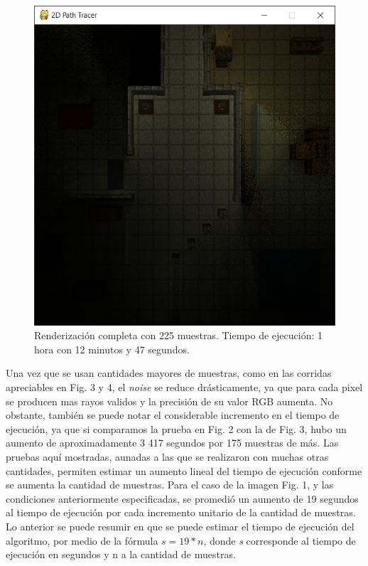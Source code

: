 \documentclass[conference]{IEEEtran}
\begin{document}
\begin{figure}[htbp]
\centerline{\includegraphics[scale=0.68]{Imagenes/Complete Lighting (225 Samples).png}}
\caption{Renderización completa con 225 muestras. Tiempo de ejecución: 1 hora con 12 minutos y 47 segundos.}
\label{225 muestras completo}
\end{figure}

Una vez que se usan cantidades mayores de muestras, como en las corridas apreciables en Fig. 3 y 4, el \textit{noise} se reduce drásticamente, ya que para cada pixel se producen mas rayos validos y la precisión de su valor RGB aumenta. No obstante, también se puede notar el considerable incremento en el tiempo de ejecución, ya que si comparamos la prueba en Fig. 2 con la de Fig. 3, hubo un aumento de aproximadamente 3 417 segundos por 175 muestras de más. Las pruebas aquí mostradas, aunadas a las que se realizaron con muchas otras cantidades, permiten estimar un aumento lineal del tiempo de ejecución conforme se aumenta la cantidad de muestras. Para el caso de la imagen Fig. 1, y las condiciones anteriormente especificadas, se promedió un aumento de 19 segundos al tiempo de ejecución por cada incremento unitario de la cantidad de muestras. Lo anterior se puede resumir en que se puede estimar el tiempo de ejecución del algoritmo, por medio de la fórmula \(s = 19 * n\), donde \textit{s} corresponde al tiempo de ejecución en segundos y n a la cantidad de muestras.
\end{document}

